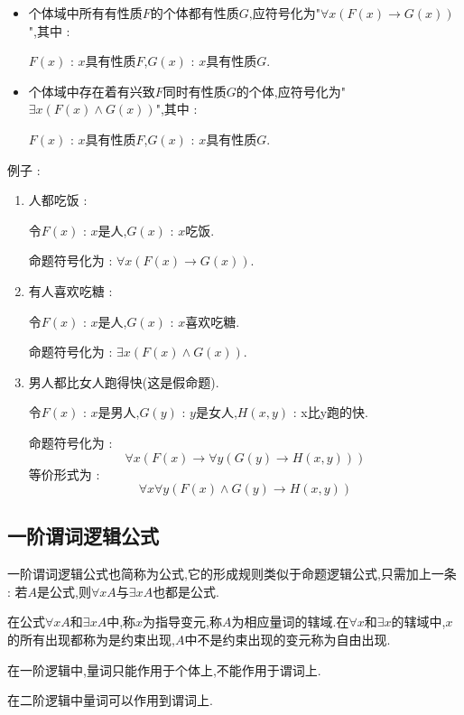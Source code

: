 {{{  \begin{itemize}
    \item {
          个体域中所有有性质$F$的个体都有性质$G$,应符号化为"$\forall x (F(x) \to G(x))$",其中 :

          $F(x)$ : $x$具有性质$F$,$G(x)$ : $x$具有性质$G$.
          }
    \item {
          个体域中存在着有兴致$F$同时有性质$G$的个体,应符号化为"$\exists x (F(x) \land G(x))$",其中 :

          $F(x)$ : $x$具有性质$F$,$G(x)$ : $x$具有性质$G$.
          }
  \end{itemize}

  例子 :
  \begin{enumerate}
    \item {
          人都吃饭 :

          令$F(x)$ : $x$是人,$G(x)$ : $x$吃饭.

          命题符号化为 : $\forall x (F(x) \to G(x))$.
          }
    \item {
          有人喜欢吃糖 :

          令$F(x)$ : $x$是人,$G(x)$ : $x$喜欢吃糖.

          命题符号化为 : $\exists x (F(x) \land G(x))$.
          }
    \item {
          男人都比女人跑得快(这是假命题).

          令$F(x)$ : $x$是男人,$G(y)$ : $y$是女人,$H(x,y)$ : x比y跑的快.

          命题符号化为 : $$
            \forall x (F(x) \to \forall y (G(y) \to H(x,y)))
          $$
          等价形式为 : $$
            \forall x \forall y (F(x) \land G(y) \to H(x,y))
          $$
          }
  \end{enumerate}
}%

\subsection{一阶谓词逻辑公式}{
  一阶谓词逻辑公式也简称为公式,它的形成规则类似于命题逻辑公式,只需加上一条 : 若$A$是公式,则$\forall x A$与$\exists x A$也都是公式.

  在公式$\forall x A$和$\exists x A$中,称$x$为指导变元,称$A$为相应量词的辖域.在$\forall x$和$\exists x$的辖域中,$x$的所有出现都称为是约束出现,$A$中不是约束出现的变元称为自由出现.

  在一阶逻辑中,量词只能作用于个体上,不能作用于谓词上.

  在二阶逻辑中量词可以作用到谓词上.

}}}
